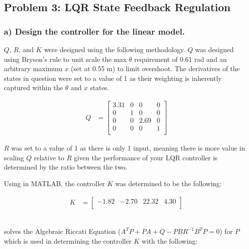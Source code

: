 \subsection*{Problem 3: LQR State Feedback Regulation}

\subsubsection*{a) Design the controller for the linear model.}

$Q$, $R$, and $K$ were designed using the following methodology. $Q$ was designed using Bryson's rule to unit scale the max $\theta$ requirement of 0.61 rad and an arbitrary maximum $x$ (set at 0.55 m) to limit overshoot. The derivatives of the states in question were set to a value of 1 as their weighting is inherently captured within the $\theta$ and $x$ states.

\begin{equation*}
    \begin{split}
        Q & =
        \begin{bmatrix}
            3.31 & 0 & 0    & 0 \\
            0    & 1 & 0    & 0 \\
            0    & 0 & 2.69 & 0 \\
            0    & 0 & 0    & 1 \\
        \end{bmatrix}
    \end{split}
\end{equation*}

$R$ was set to a value of 1 as there is only 1 input, meaning there is more value in scaling $Q$ relative to $R$ given the performance of your LQR controller is determined by the ratio between the two.

Using  in MATLAB, the controller $K$ was determined to be the following:

\begin{equation*}
    \begin{split}
        K & =
        \begin{bmatrix}
            -1.82 & -2.70 & 22.32 & 4.30 \\
        \end{bmatrix}
    \end{split}
\end{equation*}\

 solves the Algebraic Riccati Equation ($A^TP +  PA + Q -PBR^{-1}B^TP = 0$) for $P$ which is used in determining the controller $K$ with the following:

